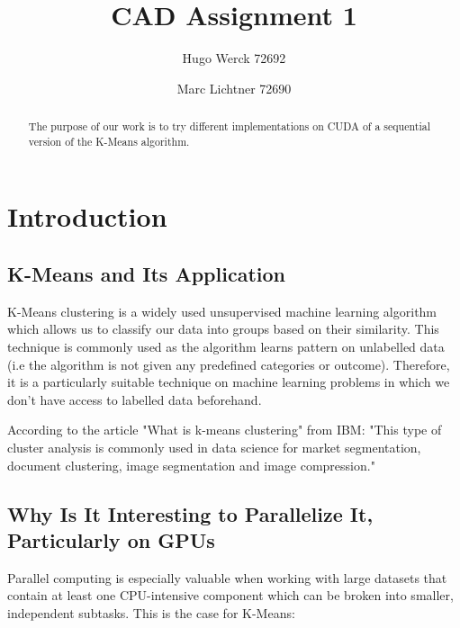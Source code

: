 \documentclass[sigconf]{acmart}
\begin{document}
\title{CAD Assignment 1}


\author{Hugo Werck 72692}

\author{Marc Lichtner 72690}


\begin{abstract}
The purpose of our work is to try different implementations on CUDA of a sequential version of the K-Means algorithm.
\end{abstract}


\maketitle

\section{Introduction}


\subsection{K-Means and Its Application}

K-Means clustering is a widely used unsupervised machine learning algorithm which allows us to classify our data into groups based on their similarity. This technique is commonly used as the algorithm learns pattern on unlabelled data (i.e the algorithm is not given any predefined categories or outcome). Therefore, it is a particularly suitable technique on machine learning problems in which we don't have access to labelled data beforehand.

According to the article "What is k-means clustering" from IBM: "This type of cluster analysis is commonly used in data science for market segmentation, document clustering, image segmentation and image compression."

\subsection{Why Is It Interesting to Parallelize It, Particularly on GPUs}

Parallel computing is especially valuable when working with large datasets that contain at least one CPU-intensive component which can be broken into smaller, independent subtasks. This is the case for K-Means:
\end{document}
